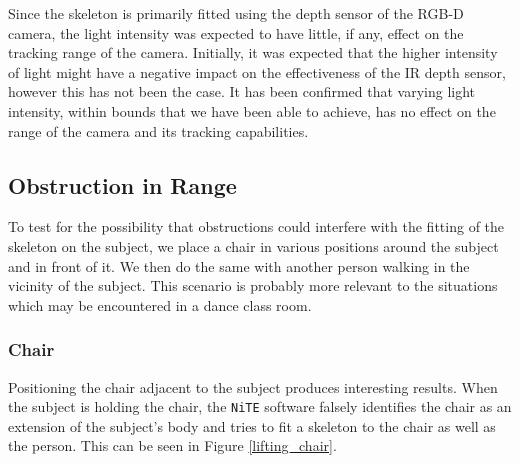 \documentclass[11pt,a4paper]{article}
\begin{document}
\noindent
Since the skeleton is primarily fitted using the depth sensor of the RGB-D camera, the light intensity was expected to have little, if any, effect on the tracking range of the camera. Initially, it was expected that the higher intensity of light might have a negative impact on the effectiveness of the IR depth sensor, however this has not been the case. It has been confirmed that varying light intensity, within bounds that we have been able to achieve, has no effect on the range of the camera and its tracking capabilities.

\subsection{Obstruction in Range}
\noindent
To test for the possibility that obstructions could interfere with the fitting of the skeleton on the subject, we place a chair in various positions around the subject and in front of it. We then do the same with another person walking in the vicinity of the subject. This scenario is probably more relevant to the situations which may be encountered in a dance class room.  
\subsubsection{Chair}
\noindent Positioning the chair adjacent to the subject produces interesting results. When the subject is holding the chair, the \texttt{NiTE} software falsely identifies the chair as an extension of the subject's body and tries to fit a skeleton to the chair as well as the person. This can be seen in Figure \ref{lifting_chair}.
\end{document}
